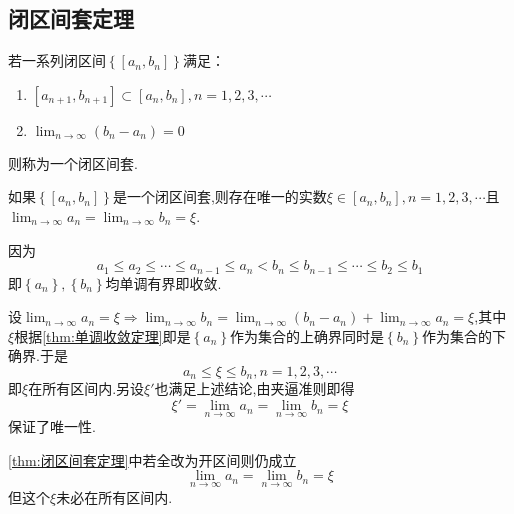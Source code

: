 \subsection{闭区间套定理}
\begin{formal}
    \begin{definition}[闭区间套的定义]\label{def:闭区间套的定义}
        若一系列闭区间$\displaystyle\left\{\left[a_n,b_n\right]\right\}$满足：\begin{enumerate}[label={\textup{(\arabic*)}}]
            \item $\displaystyle\left[a_{n+1},b_{n+1}\right]\subset\left[a_n,b_n\right],n=1,2,3,\cdots$
            \item $\displaystyle\lim_{n\to\infty}\left(b_n-a_n\right)=0$
        \end{enumerate}则称为一个闭区间套.
    \end{definition}
\end{formal}
\begin{formal}
    \begin{theorem}[闭区间套定理]\label{thm:闭区间套定理}
        如果$\displaystyle\left\{\left[a_n,b_n\right]\right\}$是一个闭区间套,则存在唯一的实数$\xi\in\left[a_n,b_n\right],n=1,2,3,\cdots$且$\displaystyle\lim_{n\to\infty}a_n=\lim_{n\to\infty}b_n=\xi$.
    \end{theorem}
    \begin{Proof}
        因为\[
        a_1\leqslant a_2\leqslant\cdots\leqslant a_{n-1}\leqslant a_n<b_n\leqslant b_{n-1}\leqslant\cdots\leqslant b_2\leqslant b_1
        \]即$\left\{a_n\right\},\left\{b_n\right\}$均单调有界即收敛.

        设$\displaystyle\lim_{n\to\infty}a_n=\xi\Longrightarrow\lim_{n\to\infty}b_n=\lim_{n\to\infty}\left(b_n-a_n\right)+\lim_{n\to\infty}a_n=\xi$,其中$\xi$根据\cref{thm:单调收敛定理}即是$\left\{a_n\right\}$作为集合的上确界同时是$\left\{b_n\right\}$作为集合的下确界.于是\[
        a_n\leqslant \xi\leqslant b_n,n=1,2,3,\cdots
        \]即$\xi$在所有区间内.另设$\xi'$也满足上述结论,由夹逼准则即得\[\xi'=
        \lim_{n\to\infty}a_n=\lim_{n\to\infty}b_n=\xi
        \]保证了唯一性.
    \end{Proof}
\end{formal}
\begin{red}
    \begin{remark}
        \cref{thm:闭区间套定理}中若全改为开区间则仍成立\[
        \lim_{n\to\infty}a_n=\lim_{n\to\infty}b_n=\xi
        \]但这个$\xi$未必在所有区间内.
    \end{remark}
\end{red}
